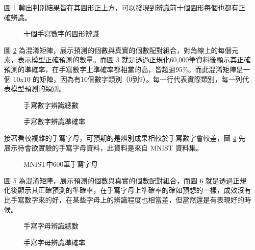 圖 \ref{fig:10手寫數字的圖形辨識} 輸出判別結果皆在其圖形正上方，可以發現到辨識前十個圖形每個也都有正確辨識。

\begin{figure}[h]
    \caption{十個手寫數字的圖形辨識}
    \label{fig:10手寫數字的圖形辨識}
\end{figure}

圖 \ref{fig:手寫數字辨識數量} 為混淆矩陣，展示預測的個數與真實的個數配對組合，對角線上的每個元素，表示模型正確預測的數量。而圖 \ref{fig:手寫數字辨識準確率} 就是透過正規化60,000筆資料後顯示其正確預測的準確率，在手寫數字上準確率都相當的高，皆超過95\%。而此混淆矩陣是一個 10x10 的矩陣，因為有10個數字類別（0到9）。每一行代表實際類別，每一列代表模型預測的類別。
 
\begin{figure}[H]
    \caption{手寫數字辨識總數}
    \label{fig:手寫數字辨識數量}
\end{figure}
\begin{figure}[H]
    \caption{手寫數字辨識準確率}
    \label{fig:手寫數字辨識準確率}
\end{figure}

接著看較複雜的手寫字母，可預期的是辨別成果相較於手寫數字會較差，圖 \ref{fig:MNIST中600筆手寫字母} 先展示待會欲實驗的手寫字母資料，此資料是來自 MNIST 資料集。
\begin{figure}[H]
    \caption{MNIST中600筆手寫字母}
    \label{fig:MNIST中600筆手寫字母}
\end{figure}

圖 \ref{fig:手寫字母辨識數量} 為混淆矩陣，展示預測的個數與真實的個數配對組合，而圖 \ref{fig:手寫字母辨識準確率} 就是透過正規化後顯示其正確預測的準確率，在手寫字母上準確率的確如預想的一樣，成效沒有比手寫數字來的好，在某些字母上的辨識程度也相當差，但當然還是有表現好的時候。

\begin{figure}[H]
    \caption{手寫字母辨識總數}
    \label{fig:手寫字母辨識數量}
\end{figure}

\begin{figure}[H]
    \caption{手寫字母辨識準確率}
    \label{fig:手寫字母辨識準確率}
\end{figure}

